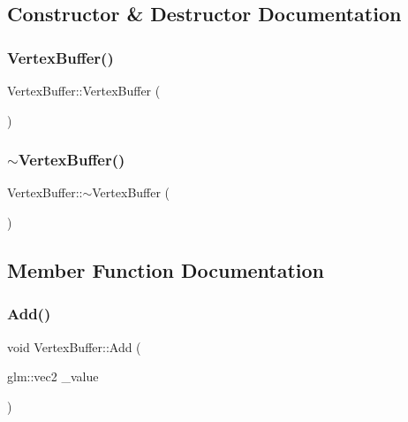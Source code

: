 \subsection{Constructor \& Destructor Documentation}
\mbox{\label{class_vertex_buffer_adb25d82a47ad82d5b69a75ac111401b8}} 
\subsubsection{\texorpdfstring{Vertex\+Buffer()}{VertexBuffer()}}
{\footnotesize\ttfamily Vertex\+Buffer\+::\+Vertex\+Buffer (\begin{DoxyParamCaption}{ }\end{DoxyParamCaption})}

\mbox{\label{class_vertex_buffer_a5216726fdd43b2ae8e1439e347717fdd}} 
\subsubsection{\texorpdfstring{$\sim$\+Vertex\+Buffer()}{~VertexBuffer()}}
{\footnotesize\ttfamily Vertex\+Buffer\+::$\sim$\+Vertex\+Buffer (\begin{DoxyParamCaption}{ }\end{DoxyParamCaption})}



\subsection{Member Function Documentation}
\mbox{\label{class_vertex_buffer_ac184944124f0496e2df432d09529cfb8}} 
\subsubsection{\texorpdfstring{Add()}{Add()}\hspace{0.1cm}{\footnotesize\ttfamily [1/3]}}
{\footnotesize\ttfamily void Vertex\+Buffer\+::\+Add (\begin{DoxyParamCaption}\item[{glm\+::vec2}]{\+\_\+value }\end{DoxyParamCaption})}

